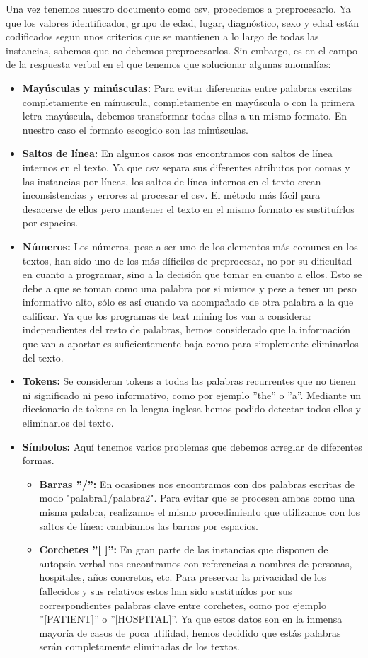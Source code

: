 \documentclass[10pt,a4paper,draft]{article}
\begin{document}
Una vez tenemos nuestro documento como csv, procedemos a preprocesarlo. Ya que los valores identificador, grupo de edad, lugar, diagnóstico, sexo y edad están codificados segun unos criterios que se mantienen a lo largo de todas las instancias, sabemos que no debemos preprocesarlos. Sin embargo, es en el campo de la respuesta verbal en el que tenemos que solucionar algunas anomalías:
\begin{itemize}
\item \textbf{Mayúsculas y minúsculas:} Para evitar diferencias entre palabras escritas completamente en mínuscula, completamente en mayúscula o con la primera letra mayúscula, debemos transformar todas ellas a un mismo formato. En nuestro caso el formato escogido son las minúsculas.
\item \textbf{Saltos de línea:} En algunos casos nos encontramos con saltos de línea internos en el texto. Ya que csv separa sus diferentes atributos por comas y las instancias por líneas, los saltos de línea internos en el texto crean inconsistencias y errores al procesar el csv. El método más fácil para desacerse de ellos pero mantener el texto en el mismo formato es sustituírlos por espacios.
\item \textbf{Números:} Los números, pese a ser uno de los elementos más comunes en los textos, han sido uno de los más díficiles de preprocesar, no por su dificultad en cuanto a programar, sino a la decisión que tomar en cuanto a ellos. Esto se debe a que se toman como una palabra por si mismos y pese a tener un peso informativo alto, sólo es así cuando va acompañado de otra palabra a la que calificar. Ya que los programas de text mining los van a considerar independientes del resto de palabras, hemos considerado que la información que van a aportar es suficientemente baja como para simplemente eliminarlos del texto.
\item \textbf{Tokens:} Se consideran tokens a todas las palabras recurrentes que no tienen ni significado ni peso informativo, como por ejemplo ''the'' o ''a''. Mediante un diccionario de tokens en la lengua inglesa hemos podido detectar todos ellos y eliminarlos del texto.
\item \textbf{Símbolos:} Aquí tenemos varios problemas que debemos arreglar de diferentes formas.
\begin{itemize} 
\item \textbf{Barras ''/'':} En ocasiones nos encontramos con dos palabras escritas de modo "palabra1/palabra2". Para evitar que se procesen ambas como una misma palabra, realizamos el mismo procedimiento que utilizamos con los saltos de línea: cambiamos las barras por espacios.
\item \textbf{Corchetes ''[ ]'':} En gran parte de las instancias que disponen de autopsia verbal nos encontramos con referencias a nombres de personas, hospitales, años concretos, etc. Para preservar la privacidad de los fallecidos y sus relativos estos han sido sustituídos por sus correspondientes palabras clave entre corchetes, como por ejemplo ''[PATIENT]'' o ''[HOSPITAL]''. Ya que estos datos son en la inmensa mayoría de casos de poca utilidad, hemos decidido que estás palabras serán completamente eliminadas de los textos.
\end{itemize}
\end{itemize}
\end{document}
